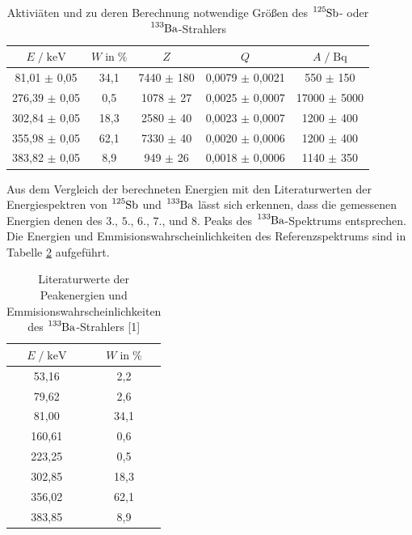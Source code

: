 \begin{table}
  \centering
  \caption{Aktiviäten und zu deren Berechnung notwendige Größen des $\ce{^{125}Sb}$- oder $\ce{^{133}Ba}$-Strahlers}
  \label{tab:mess5}
  \begin{tabular}{c c c c c}
  \toprule
  $E \;/\; \si{\kilo\eV}$ & $W \;\text{in}\; \si{\percent}$ & $Z$ & $Q$ & $A \;/\; \si{\becquerel}$ \\
  \midrule
     81,01 $\pm$ 0,05 & 34,1 & 7440 $\pm$ 180 & 0,0079 $\pm$ 0,0021 &   550 $\pm$  150 \\
    276,39 $\pm$ 0,05 &  0,5 & 1078 $\pm$  27 & 0,0025 $\pm$ 0,0007 & 17000 $\pm$ 5000 \\
    302,84 $\pm$ 0,05 & 18,3 & 2580 $\pm$  40 & 0,0023 $\pm$ 0,0007 &  1200 $\pm$  400 \\
    355,98 $\pm$ 0,05 & 62,1 & 7330 $\pm$  40 & 0,0020 $\pm$ 0,0006 &  1200 $\pm$  400 \\
    383,82 $\pm$ 0,05 &  8,9 &  949 $\pm$  26 & 0,0018 $\pm$ 0,0006 &  1140 $\pm$  350 \\
  \bottomrule
  \end{tabular}
\end{table}

Aus dem Vergleich der berechneten Energien mit den Literaturwerten der Energiespektren von $\ce{^{125}Sb}$ und $\ce{^{133}Ba}$
lässt sich erkennen, dass die gemessenen Energien denen des $3$., $5$., $6$., $7$., und $8$. Peaks des $\ce{^{133}Ba}$-Spektrums
entsprechen. Die Energien und Emmisionswahrscheinlichkeiten des Referenzspektrums sind in Tabelle \ref{tab:mess6} aufgeführt. \\

\begin{table}
  \centering
  \caption{Literaturwerte der Peakenergien und Emmisionswahrscheinlichkeiten des $\ce{^{133}Ba}$-Strahlers [1]}
  \label{tab:mess6}
  \begin{tabular}{c c}
  \toprule
  $E \;/\; \si{\kilo\eV}$ & $W \;\text{in}\; \si{\percent}$ \\
  \midrule
     53,16 &  2,2 \\
     79,62 &  2,6 \\
     81,00 & 34,1 \\
    160,61 &  0,6 \\
    223,25 &  0,5 \\
    302,85 & 18,3 \\
    356,02 & 62,1 \\
    383,85 &  8,9 \\
  \bottomrule
  \end{tabular}
\end{table}

